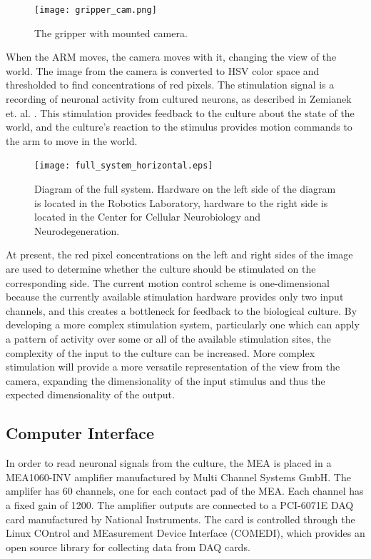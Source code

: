 \documentclass[letterpaper]{article}
\begin{document}
\begin{figure}
	\centering
	\texttt{[image: gripper\_cam.png]}
	\caption{The gripper with mounted camera.}
	\label{fig:cam_on_gripper}
\end{figure}


When the ARM moves, the camera moves with it, changing the view of the world. 
The image from the camera is converted to HSV color space and thresholded to find concentrations of red pixels.
The stimulation signal is a recording of neuronal activity from cultured neurons, as described in Zemianek et. al. .
This stimulation provides feedback to the culture about the state of the world, and the culture's reaction to the stimulus provides motion commands to the arm to move in the world. 

\begin{figure}
	\centering
	\texttt{[image: full\_system\_horizontal.eps]}
	\caption{Diagram of the full system. Hardware on the left side of the diagram is located in the Robotics Laboratory, hardware to the right side is located in the Center for Cellular Neurobiology and Neurodegeneration.}
	\label{fig:full_loop}
\end{figure}


At present, the red pixel concentrations on the left and right sides of the image are used to determine whether the culture should be stimulated on the corresponding side. 
The current motion control scheme is one-dimensional because the currently available stimulation hardware provides only two input channels, and this creates a bottleneck for feedback to the biological culture. 
By developing a more complex stimulation system, particularly one which can apply a pattern of activity over some or all of the available stimulation sites, the complexity of the input to the culture can be increased. 
More complex stimulation will provide a more versatile representation of the view from the camera, expanding the dimensionality of the input stimulus and thus the expected dimensionality of the output.

\subsection{Computer Interface}

In order to read neuronal signals from the culture, the MEA is placed in a MEA1060-INV amplifier manufactured by Multi Channel Systems GmbH. 
The amplifer has 60 channels, one for each contact pad of the MEA.
Each channel has a fixed gain of 1200.
The amplifier outputs are connected to a PCI-6071E DAQ card manufactured by National Instruments. 
The card is controlled through the Linux COntrol and MEasurement Device Interface (COMEDI), which provides an open source library for collecting data from DAQ cards. 
\end{document}
